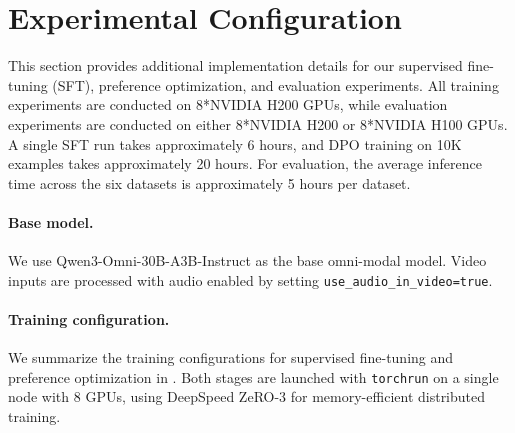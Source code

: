 
\section{Experimental Configuration}
\label{app:experimental-configuration}

This section provides additional implementation details for our supervised fine-tuning (SFT), preference optimization, and evaluation experiments. All training experiments are conducted on 8*NVIDIA H200 GPUs, while evaluation experiments are conducted on either 8*NVIDIA H200 or 8*NVIDIA H100 GPUs. A single SFT run takes approximately 6 hours, and DPO training on 10K examples takes approximately 20 hours. For evaluation, the average inference time across the six datasets is approximately 5 hours per dataset.

\paragraph{Base model.}
We use Qwen3-Omni-30B-A3B-Instruct as the base omni-modal model. Video inputs are processed with audio enabled by setting \texttt{use\_audio\_in\_video=true}.

\paragraph{Training configuration.}
We summarize the training configurations for supervised fine-tuning and preference optimization in . Both stages are launched with \texttt{torchrun} on a single node with 8 GPUs, using DeepSpeed ZeRO-3 for memory-efficient distributed training. 

